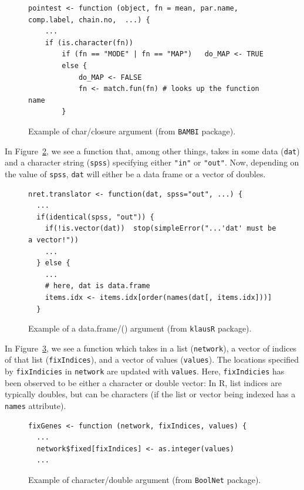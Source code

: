 \documentclass[acmsmall,10pt,review,anonymous]{acmart}\settopmatter{printfolios=true,printccs=false,printacmref=false}
\begin{document}
\begin{figure}[!hb]{\small\begin{lstlisting}[style=R]
pointest <- function (object, fn = mean, par.name, comp.label, chain.no,  ...) {
    ...
    if (is.character(fn))
        if (fn == "MODE" | fn == "MAP")   do_MAP <- TRUE
        else {
            do_MAP <- FALSE
            fn <- match.fun(fn) # looks up the function name
        }
\end{lstlisting}}\caption{Example of char/closure argument (from {\tt BAMBI} package).}\label{fig:charclos}\end{figure}

  In Figure~\ref{fig:dfdbl}, we see a
function that, among other things, takes in some data ({\tt dat}) and a
character string ({\tt spss}) specifying either {\tt "in"} or {\tt "out"}.
Now, depending on the value of {\tt spss}, {\tt dat} will either be a data
frame or a vector of doubles.

\begin{figure}[!hb]{\small\begin{lstlisting}[style=R]
nret.translator <- function(dat, spss="out", ...) {
  ...
  if(identical(spss, "out")) {
    if(!is.vector(dat))  stop(simpleError("...'dat' must be a vector!"))
    ...
  } else {
    ...
    # here, dat is data.frame
    items.idx <- items.idx[order(names(dat[, items.idx]))]
  }
\end{lstlisting}}\caption{Example of a data.frame/(\D) argument (from {\tt klausR} package).}\label{fig:dfdbl}\end{figure}

In Figure~\ref{fig:chardbl}, we see a function which takes in a list ({\tt network}), a vector of indices of that list ({\tt fixIndices}), and a
vector of values ({\tt values}).  The locations specified by {\tt fixIndicies} in {\tt network} are updated with {\tt values}.  Here, {\tt fixIndicies} has been observed to be either a character or double vector:
In R, list indices are typically doubles, but can be characters (if the list
or vector being indexed has a {\tt names} attribute).

\begin{figure}[!hb]{\small\begin{lstlisting}[style=R]
fixGenes <- function (network, fixIndices, values) {
  ...
  network$fixed[fixIndices] <- as.integer(values)
  ...
\end{lstlisting}}\caption{Example of character/double argument (from {\tt BoolNet} package).}\label{fig:chardbl}\end{figure}%
\end{document}
